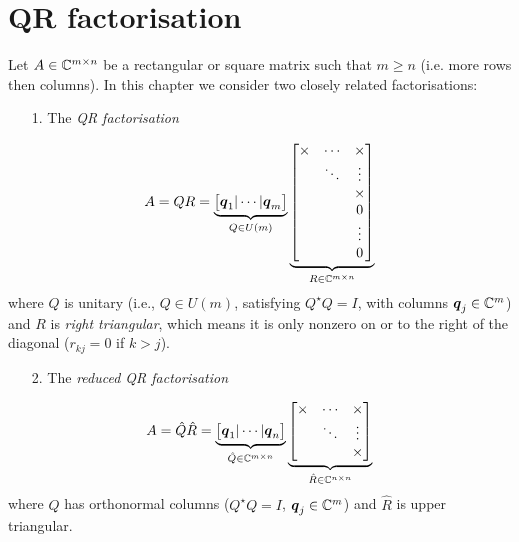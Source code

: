 
\section{QR factorisation}
Let $A \in {\mathbb C}^{m \times n}$ be a rectangular or square matrix such that $m \ensuremath{\geq} n$ (i.e. more rows then columns). In this chapter we consider two closely related factorisations:

\begin{itemize}
\item[1. ] The \emph{QR factorisation}

\end{itemize}
\[
A = Q R = \underbrace{\begin{bmatrix} \ensuremath{\bm{\q}}_1 | \ensuremath{\cdots} | \ensuremath{\bm{\q}}_m \end{bmatrix}}_{Q \ensuremath{\in} U(m)} \underbrace{\begin{bmatrix} \ensuremath{\times} & \ensuremath{\cdots} & \ensuremath{\times} \\ & \ensuremath{\ddots} & \ensuremath{\vdots} \\ && \ensuremath{\times} \\ &&0 \\ &&\ensuremath{\vdots} \\ && 0 \end{bmatrix}}_{R \ensuremath{\in} \ensuremath{\bbC}^{m \ensuremath{\times} n}}
\]
where $Q$ is unitary (i.e., $Q \ensuremath{\in} U(m)$, satisfying $Q^\ensuremath{\star}Q = I$, with columns $\bm{{\mbox{\boldmath$q$\unboldmath}}}_j \in {\mathbb C}^m$) and $R$ is \emph{right triangular}, which means it  is only nonzero on or to the right of the diagonal ($r_{kj} = 0$ if $k > j$).

\begin{itemize}
\item[2. ] The \emph{reduced QR factorisation}

\end{itemize}
\[
A = \hat Q \hat R = \underbrace{\begin{bmatrix} \ensuremath{\bm{\q}}_1 | \ensuremath{\cdots} | \ensuremath{\bm{\q}}_n \end{bmatrix}}_{ \hat Q \ensuremath{\in} \ensuremath{\bbC}^{m \ensuremath{\times} n}} \underbrace{\begin{bmatrix} \ensuremath{\times} & \ensuremath{\cdots} & \ensuremath{\times} \\ & \ensuremath{\ddots} & \ensuremath{\vdots} \\ && \ensuremath{\times}  \end{bmatrix}}_{\hat R \ensuremath{\in} \ensuremath{\bbC}^{n \ensuremath{\times} n}}
\]
where $Q$ has orthonormal columns ($Q^\ensuremath{\star} Q = I$, $\bm{{\mbox{\boldmath$q$\unboldmath}}}_j \in {\mathbb C}^m$) and $\hat R$ is upper triangular.

